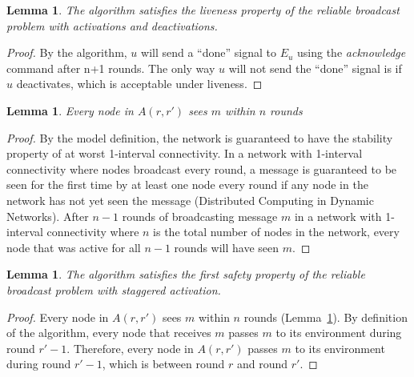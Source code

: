 \documentclass[english]{article}
\newtheorem{lemma}[theorem]{Lemma}
\begin{document}
\begin{lemma}
\label{DeactivationRBLiveness}
The algorithm satisfies the liveness property of the reliable broadcast problem with activations and deactivations.
\end{lemma}
\begin{proof}

By the algorithm, $u$ will send  a ``done'' signal to $E_u$ using the \textit{acknowledge} command after n+1 rounds. The only way $u$ will not send the ``done'' signal is if $u$ deactivates, which is acceptable under liveness.
\end{proof}

\begin{lemma}
\label{RBDeactivationReceive}
Every node in $A(r,r')$ sees $m$ within $n$ rounds
\end{lemma}
\begin{proof}

By the model definition, the network is guaranteed to have the stability property of at worst 1-interval connectivity. In a network with 1-interval connectivity where nodes broadcast every round, a message is guaranteed to be seen for the first time by at least one node every round if any node in the network has not yet seen the message (Distributed Computing in Dynamic Networks). After $n-1$ rounds of broadcasting message $m$ in a network with 1-interval connectivity where $n$ is the total number of nodes in the network, every node that was active for all $n-1$ rounds will have seen $m$.

\end{proof}


\begin{lemma}
\label{DeactivationRBSafety1}
The algorithm satisfies the first safety property of the reliable broadcast problem with staggered activation.
\end{lemma}
\begin{proof}


Every node in $A(r,r')$ sees $m$ within $n$ rounds (Lemma~\ref{RBDeactivationReceive}). By definition of the algorithm, every node that receives $m$ passes $m$ to its environment during round $r'-1$. Therefore, every node in $A(r,r')$ passes $m$ to its environment during round $r'-1$, which is between round $r$ and round $r'$.

\end{proof}
\end{document}
